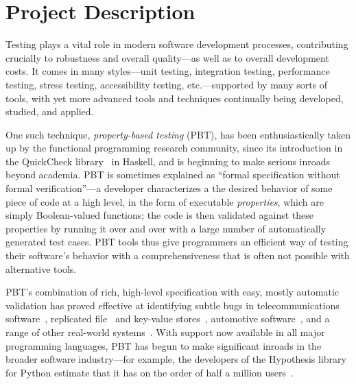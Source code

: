 \section*{Project Description}

\iflater{}\fi

Testing plays a vital role in modern software development processes,
contributing crucially to robustness and overall quality---as well as
to overall development costs.
%
It comes in many styles---unit testing, integration testing,
performance testing, stress testing, accessibility testing,
etc.---supported by many sorts of tools, with yet more advanced tools
and techniques continually being developed, studied, and applied.

One such technique, {\em property-based testing} (PBT), has been
enthusiastically taken up by the functional programming research
community, since its introduction in the QuickCheck
library~\cite{ClaessenHughes00} in Haskell, and is beginning to make
serious inroads beyond academia.
%
PBT is sometimes explained as ``formal specification without formal
verification''---a developer characterizes a the desired behavior of
some piece of code at a high level, in the form of executable {\em
  properties}, which are simply Boolean-valued functions; the code is
then validated against these properties by running it over and over
with a large number of automatically generated test cases.
%
PBT tools thus give programmers an efficient way of testing their
software's behavior with a comprehensiveness that is often not
possible with alternative tools.

PBT's combination of rich, high-level specification with easy, mostly
automatic validation has proved effective at identifying subtle
bugs in telecommunications software~\cite{arts2006testing}, replicated
file~\cite{hughes2014mysteries} and key-value
stores~\cite{Bornholt2021}, automotive software~\cite{arts2015testing}, and a range
of other real-world systems~\cite{hughes2016experiences}. With support
now available in all major programming languages, PBT has
begun to make significant inroads in the broader software
industry---for example, the developers of the Hypothesis library for
Python estimate that it has on the order of half a million
users~\cite{ZacPersonalCommunication}.

\newcommand{\participant}[1]{{P#1}}

